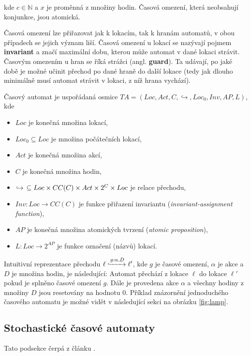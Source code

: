 kde $c \in \mathbb{N}$ a $x$ je proměnná z množiny hodin. Časová omezení, která neobsahují konjunkce, jsou atomická.

Časová omezení lze přiřazovat jak k lokacím, tak k hranám automatů, v obou případech se jejich význam liší. Časová omezení u lokací se nazývají pojmem \textbf{invariant} a značí maximální dobu, kterou může automat v dané lokaci strávit. Časovým omezením u hran se říká strážci (angl. \textbf{guard}). Ta udávají, po jaké době je možné učinit přechod po dané hraně do další lokace (tedy jak dlouho minimálně musí automat strávit v lokaci, z níž hrana vychází).

\bigskip

Časový automat je uspořádaná osmice $TA = (Loc, Act, C, \hookrightarrow, Loc_0, Inv, AP, L)$, kde

\begin{itemize}
    \item $Loc$ je konečná množina lokací,
    \item $Loc_0 \subseteq Loc$ je množina počátečních lokací,
    \item $Act$ je konečná množina akcí,
    \item $C$ je konečná množina hodin,
    \item $\hookrightarrow \hspace{0.15cm} \subseteq Loc \times CC(C) \times Act \times 2^C \times Loc$ je relace přechodu,
    \item $Inv: Loc \rightarrow CC(C)$ je funkce přiřazení invariantu (\textit{invariant-assignment function}),
    \item $AP$ je konečná množina atomických tvrzení (\textit{atomic proposition}),
    \item $L: Loc \rightarrow 2^{AP}$ je funkce označení (názvů) lokací.
\end{itemize}

Intuitivní reprezentace přechodu $\ell \xhookrightarrow{g:\alpha,D} \ell'$, kde $g$ je časové omezení, $\alpha$ je akce a $D$ je množina hodin, je následující: Automat přechází z lokace $\ell$ do lokace $\ell'$ pokud je splněno časové omezení $g$. Dále je provedena akce $\alpha$ a všechny hodiny z množiny $D$ jsou resetovány na hodnotu 0. Příklad znázornění jednoduchého časového automatu je možné vidět v následující sekci na obrázku \ref{fig:lamp}.

\subsection{Stochastické časové automaty} \label{stochastic_ta}
Tato podsekce čerpá z článku \cite{uppaal_smc}.

